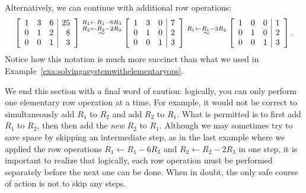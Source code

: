 \begin{solution}
  Alternatively, we can continue with additional row operations:
  \begin{equation*}
    \left[ 
    \begin{array}{rrr|r}
      1 & 3 & 6 & 25 \\
      0 & 1 & 2 & 8 \\
      0 & 0 & 1 & 3
    \end{array}
    \right]
    \stackrel{R_1\leftarrow R_1-6R_3}{\stackrel{R_2\leftarrow R_2-2R_3}{\sim}}
    \left[ 
    \begin{array}{rrr|r}
      1 & 3 & 0 & 7 \\
      0 & 1 & 0 & 2\\
      0 & 0 & 1 & 3
    \end{array}
    \right]
    \stackrel{R_1\leftarrow R_1-3R_2}{\sim}
    \left[ 
    \begin{array}{rrr|r}
      1 & 0 & 0 & 1\\
      0 & 1 & 0 & 2\\
      0 & 0 & 1 & 3
    \end{array}
    \right].
  \end{equation*}
  Notice how this notation is much more succinct than what we used in
  Example~\ref{exa:solvingasystemwithelementaryops}.
\end{solution}

We end this section with a final word of caution: logically, you can
only perform one elementary row operation at a time. For example, it
would not be correct to simultaneously add $R_1$ to $R_2$ and add
$R_2$ to $R_1$. What is permitted is to first add $R_1$ to $R_2$, then
then add the {\em new} $R_2$ to $R_1$. Although we may sometimes try
to save space by skipping an intermediate step, as in the last example
where we applied the row operations $R_1\leftarrow R_1-6R_3$ and
$R_2\leftarrow R_2-2R_3$ in one step, it is important to realize that
logically, each row operation must be performed separately before the
next one can be done. When in doubt, the only safe course of action is
not to skip any steps.
